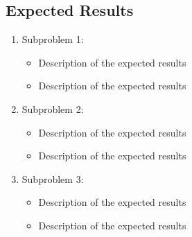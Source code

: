 \begin{multicols}{2}
\subsection{Expected Results}

\begin{enumerate}
    \item Subproblem 1: 
        \begin{itemize}
            \item Description of the expected results
            \item Description of the expected results
        \end{itemize}
    \item Subproblem 2:
        \begin{itemize}
            \item Description of the expected results
            \item Description of the expected results
        \end{itemize}
    \item Subproblem 3:
        \begin{itemize}
            \item Description of the expected results
            \item Description of the expected results
        \end{itemize}
\end{enumerate}

\end{multicols}
\bigskip